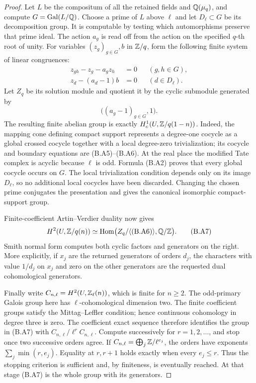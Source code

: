 \begin{proof}
Let \(L\) be the compositum of all the retained fields and
\(\mathbb Q(\mu_q)\), and compute \(G=\operatorname{Gal}(L/\mathbb Q)\).
Choose a prime of \(L\) above \(\ell\) and let \(D_\ell\subset G\)
be its decomposition group.  It is computable by testing which
automorphisms preserve that prime ideal.  The action \(a_g\) is
read off from the action on the specified \(q\)-th root of unity.
For variables \((z_g)_{g\in G},b\) in \(\mathbb Z/q\), form the
following finite system of linear congruences:
\[
 \begin{aligned}
 z_{gh}-z_g-a_gz_h&=0 &&(g,h\in G),\\
 z_d-(a_d-1)b&=0 &&(d\in D_\ell).
 \end{aligned}
\tag{B.A5}
\]
Let \(Z_q\) be its solution module and quotient it by the cyclic
submodule generated by
\[
 \bigl((a_g-1)_{g\in G},1\bigr).
\tag{B.A6}
\]
The resulting finite abelian group is exactly
\(H^1_c(U,\mathbb Z/q(1-n))\).  Indeed, the mapping cone defining
compact support represents a degree-one cocycle as a global
crossed cocycle together with a local degree-zero trivialization;
its cocycle and boundary equations are (B.A5)--(B.A6).  At the
real place the modified Tate complex is acyclic because \(\ell\)
is odd.  Formula (B.A2) proves that every global cocycle occurs on
\(G\).  The local trivialization condition depends only on its
image \(D_\ell\), so no additional local cocycles have been
discarded.  Changing the chosen prime conjugates the presentation
and gives the canonical isomorphic compact-support group.

Finite-coefficient Artin--Verdier duality now gives
\[
 H^2(U,\mathbb Z/q(n))
 \simeq\operatorname{Hom}\bigl(Z_q/\langle\text{(B.A6)}\rangle,
                                  \mathbb Q/\mathbb Z\bigr).
\tag{B.A7}
\]
Smith normal form computes both cyclic factors and generators on
the right.  More explicitly, if \(x_j\) are the returned generators
of orders \(d_j\), the characters with value \(1/d_j\) on
\(x_j\) and zero on the other generators are the requested
dual cohomological generators.

Finally write \(C_{n,\ell}=H^2(U,\mathbb Z_\ell(n))\), which is finite
for \(n\ge2\).  The odd-primary Galois group here has
\(\ell\)-cohomological dimension two.  The finite coefficient
groups satisfy the Mittag--Leffler condition; hence continuous
cohomology in degree three is zero.  The coefficient exact sequence
therefore identifies the group in (B.A7) with
\(C_{n,\ell}/\ell^r C_{n,\ell}\).
Compute successively for \(r=1,2,\ldots\), and stop once two
successive orders agree.  If
\(C_{n,\ell}=\bigoplus_j\mathbb Z/\ell^{e_j}\), the orders have
exponents \(\sum_j\min(r,e_j)\).  Equality at \(r,r+1\)
holds exactly when every \(e_j\le r\).  Thus the stopping
criterion is sufficient and, by finiteness, is eventually reached.
At that stage (B.A7) is the whole group with its generators.


\end{proof}
